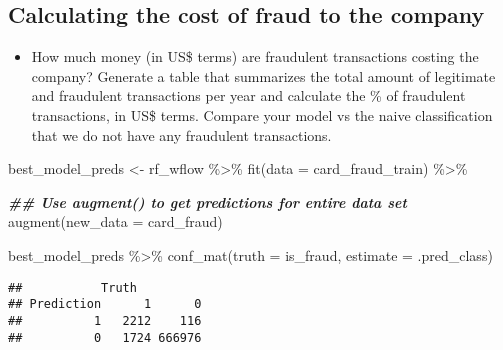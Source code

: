 \documentclass[
]{article}
\newenvironment{Shaded}{\begin{snugshade}}{\end{snugshade}}
\newcommand{\AttributeTok}[1]{\textcolor[rgb]{0.77,0.63,0.00}{#1}}
\newcommand{\DocumentationTok}[1]{\textcolor[rgb]{0.56,0.35,0.01}{\textbf{\textit{#1}}}}
\newcommand{\FunctionTok}[1]{\textcolor[rgb]{0.00,0.00,0.00}{#1}}
\newcommand{\NormalTok}[1]{#1}
\newcommand{\OtherTok}[1]{\textcolor[rgb]{0.56,0.35,0.01}{#1}}
\newcommand{\SpecialCharTok}[1]{\textcolor[rgb]{0.00,0.00,0.00}{#1}}
\providecommand{\tightlist}{%
  \setlength{\itemsep}{0pt}\setlength{\parskip}{0pt}}
\begin{document}
\hypertarget{calculating-the-cost-of-fraud-to-the-company}{%
\subsection{Calculating the cost of fraud to the
company}\label{calculating-the-cost-of-fraud-to-the-company}}

\begin{itemize}
\tightlist
\item
  How much money (in US\$ terms) are fraudulent transactions costing the
  company? Generate a table that summarizes the total amount of
  legitimate and fraudulent transactions per year and calculate the \%
  of fraudulent transactions, in US\$ terms. Compare your model vs the
  naive classification that we do not have any fraudulent transactions.
\end{itemize}

\begin{Shaded}
\begin{Highlighting}[]
\NormalTok{best\_model\_preds }\OtherTok{\textless{}{-}} 
\NormalTok{  rf\_wflow }\SpecialCharTok{\%\textgreater{}\%} 
  \FunctionTok{fit}\NormalTok{(}\AttributeTok{data =}\NormalTok{ card\_fraud\_train) }\SpecialCharTok{\%\textgreater{}\%}  
  
  \DocumentationTok{\#\# Use \textasciigrave{}augment()\textasciigrave{} to get predictions for entire data set}
  \FunctionTok{augment}\NormalTok{(}\AttributeTok{new\_data =}\NormalTok{ card\_fraud)}

\NormalTok{best\_model\_preds }\SpecialCharTok{\%\textgreater{}\%} 
  \FunctionTok{conf\_mat}\NormalTok{(}\AttributeTok{truth =}\NormalTok{ is\_fraud, }\AttributeTok{estimate =}\NormalTok{ .pred\_class)}
\end{Highlighting}
\end{Shaded}

\begin{verbatim}
##           Truth
## Prediction      1      0
##          1   2212    116
##          0   1724 666976
\end{verbatim}
\end{document}
